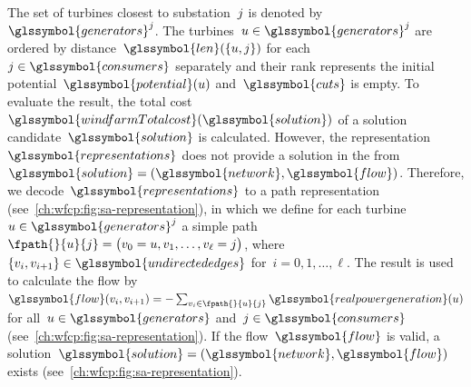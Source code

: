 The set of turbines closest to substation~$j$ is denoted
by~$\glssymbol{generators}^{\substation}$. The
turbines~$\vertexa\in\glssymbol{generators}^{\substation}$ are ordered by
distance~$\glssymbol{len}(\{\vertexa,\substation\})$ for
each~$\substation\in\glssymbol{consumers}$ separately and their rank represents
the initial potential~$\glssymbol{potential}(\vertexa)$ and~$\glssymbol{cuts}$
is empty. To evaluate the result, the total
cost~$\glssymbol{windfarmTotalcost}(\glssymbol{solution})$ of a solution
candidate~$\glssymbol{solution}$ is calculated. However, the
representation~$\glssymbol{representations}$ does not provide a solution in the
from~$\glssymbol{solution}=(\glssymbol{network},
\glssymbol{flow})$.
Therefore, we decode~$\glssymbol{representations}$ to a path representation
(see~\cref{ch:wfcp:fig:sa-representation}), in which we define for each
turbine~$\vertexa\in\glssymbol{generators}^{\substation}$ a simple
path~$\fpath{}{\vertexa}{\substation} = \big(\vertex_0=\vertexa,
\vertex_1, \dots,\vertex_\ell=\substation\big)$, where~$\{\vertex_{i},
\vertex_{i+1}\}\in\glssymbol{undirectededges}$ for~$i=0,1,\dots,\ell$. The
result is used to calculate the flow by~$
\glssymbol{flow}(\vertex_i,\vertex_{i+1})
=
-\sum_{\vertex_i\in\fpath{}{\vertexa}{\substation}} 
\glssymbol{realpowergeneration}(\vertexa)
$ for all~$\vertexa\in \glssymbol{generators}$ and~$\substation\in
\glssymbol{consumers}$ (see~\cref{ch:wfcp:fig:sa-representation}). If
the flow~$\glssymbol{flow}$ is valid, a solution~$
\glssymbol{solution}
=(
\glssymbol{network},
\glssymbol{flow})$ exists (see~\cref{ch:wfcp:fig:sa-representation}).

